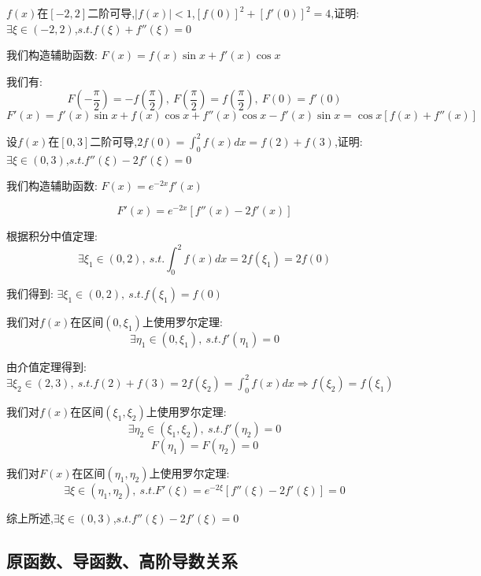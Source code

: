 
\begin{proposition}
	$f(x)$在$[-2,2]$二阶可导,$|f(x)|<1$,$[f(0)]^{2}+[f'(0)]^{2}=4$,证明: $\exists \xi\in(-2,2)$,$s.t. f(\xi)+f''(\xi)=0$
\end{proposition}
\begin{solution}

	我们构造辅助函数: $F(x)=f(x)\sin x+f'(x)\cos x$

	我们有: $$F(-\frac{\pi}{2})=-f(\frac{\pi}{2}),\ F(\frac{\pi}{2})=f(\frac{\pi}{2}),\ F(0)=f'(0)$$
	$$F'(x)=f'(x)\sin x+f(x)\cos x+f''(x)\cos x-f'(x)\sin x=\cos x[f(x)+f''(x)]$$
\end{solution}


\begin{proposition}
	设$f(x)$在$[0,3]$二阶可导,$2f(0)=\int_{0}^{2}f(x)dx=f(2)+f(3)$,证明: $\exists \xi\in(0,3)$,$s.t. f''(\xi)-2f'(\xi)=0$
\end{proposition}
\begin{solution}

	我们构造辅助函数: $F(x)=e^{-2x}f'(x)$

	$$F'(x)=e^{-2x}[f''(x)-2f'(x)]$$

	根据积分中值定理:
	$$\exists \xi_{1}\in(0,2),\ s.t. \int_{0}^{2}f(x)dx=2f(\xi_{1})=2f(0)$$

	我们得到: $\exists \xi_{1}\in(0,2),\ s.t.f(\xi_{1})=f(0)$

	我们对$f(x)$在区间$(0,\xi_{1})$上使用罗尔定理:
	$$\exists \eta_{1}\in(0,\xi_{1}),\ s.t. f'(\eta_{1})=0$$

	由介值定理得到: $\exists \xi_{2}\in(2,3),\ s.t. f(2)+f(3)=2f(\xi_{2})=\int_{0}^{2}f(x)dx\Rightarrow f(\xi_{2})=f(\xi_{1})$

	我们对$f(x)$在区间$(\xi_{1},\xi_{2})$上使用罗尔定理:
	$$\exists \eta_{2}\in(\xi_{1},\xi_{2}),\ s.t. f'(\eta_{2})=0$$
	$$F(\eta_{1})=F(\eta_{2})=0$$

	我们对$F(x)$在区间$(\eta_{1},\eta_{2})$上使用罗尔定理:
	$$\exists \xi\in(\eta_{1},\eta_{2}),\ s.t. F'(\xi)=e^{-2\xi}[f''(\xi)-2f'(\xi)]=0$$

	综上所述,$\exists \xi\in(0,3)$,$s.t. f''(\xi)-2f'(\xi)=0$
\end{solution}


\subsection{原函数、导函数、高阶导数关系}

